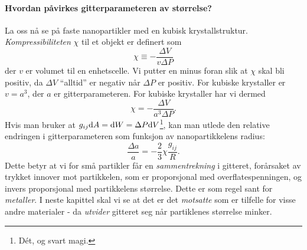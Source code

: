 \paragraph{Hvordan påvirkes gitterparameteren av størrelse?} 
La oss nå se på faste nanopartikler med en kubisk krystallstruktur. \emph{Kompressibiliteten} $\chi$ til et objekt er definert som
\begin{equation}
	\chi \equiv -\frac{\Delta V}{v\Delta P}
\end{equation}
der $v$ er volumet til en enhetscelle. Vi putter en minus foran slik at $\chi$ skal bli positiv, da $\Delta V$ ``alltid'' er negativ når $\Delta P$ er positiv. For kubiske krystaller er $v=a^3$, der $a$ er gitterparameteren. For kubiske krystaller har vi dermed
\begin{equation}
	\chi = -\frac{\Delta V}{a^3 \Delta P}.
\end{equation}
Hvis man bruker at $g_{ij}\text{d}A=\text{d}W=\Delta P \text{d}V$\footnote{Dét, og svart magi.}, kan man utlede den relative endringen i gitterparameteren som funksjon av nanopartikkelens radius:
\begin{equation}
	\frac{\Delta a}{a} = -\frac{2}{3}\chi\frac{g_{ij}}{R}.
\end{equation}
Dette betyr at vi for små partikler får en \emph{sammentrekning} i gitteret, forårsaket av trykket innover mot partikkelen, som er proporsjonal med overflatespenningen, og invers proporsjonal med partikkelens størrelse. Dette er som regel sant for \emph{metaller}. I neste kapittel skal vi se at det er det \emph{motsatte} som er tilfelle for visse andre materialer - da \emph{utvider} gitteret seg når partiklenes størrelse minker.

